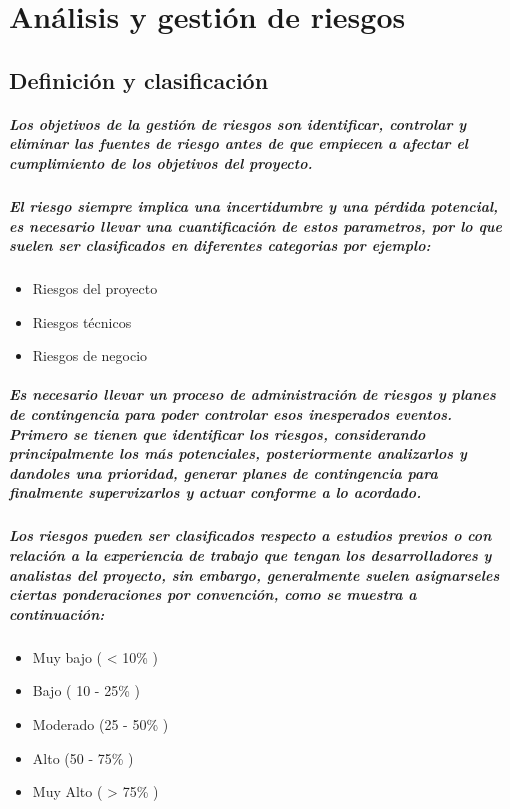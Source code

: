 \chapter{Análisis y gestión de riesgos}
\iffalse
  \section{Definición y clasificación}
    \paragraph{Los objetivos de la gestión de riesgos son identificar, controlar y eliminar las fuentes de riesgo antes de que empiecen a afectar el cumplimiento de los objetivos del proyecto.}
    \paragraph{El riesgo siempre implica una incertidumbre y una pérdida potencial, es necesario llevar una cuantificación de estos parametros, por lo que suelen ser clasificados en diferentes categorias por ejemplo:}
    \begin{itemize}
      \item Riesgos del proyecto
      \item Riesgos técnicos
      \item Riesgos de negocio
    \end{itemize}
    \paragraph{Es necesario llevar un proceso de administración de riesgos y planes de contingencia para poder controlar esos inesperados eventos. Primero se tienen que identificar los riesgos, considerando principalmente los más potenciales, posteriormente analizarlos y dandoles una prioridad, generar planes de contingencia para finalmente supervizarlos y actuar conforme a lo acordado.}
    \paragraph{Los riesgos pueden ser clasificados respecto a estudios previos o con relación a la experiencia de trabajo que tengan los desarrolladores y analistas del proyecto, sin embargo, generalmente suelen asignarseles ciertas ponderaciones por convención, como se muestra a continuación:}
    \begin{itemize}
      \item Muy bajo ( < 10\% )
      \item Bajo ( 10 - 25\% )
      \item Moderado (25 - 50\% )
      \item Alto (50 - 75\% )
      \item Muy Alto ( > 75\% )
    \end{itemize}
